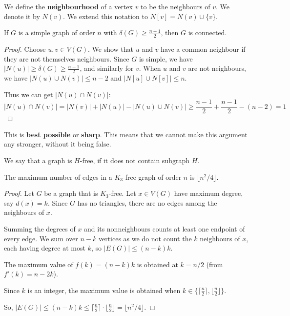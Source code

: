 We define the \textbf{neighbourhood} of a vertex $v$ to be the neighbours of $v$. We denote it by $N(v)$. We extend this notation to $N[v] = N(v) \cup \{v\}$.

\begin{proposition}
	If $G$ is a simple graph of order $n$ with $\delta(G) \ge \frac{n-1}{2}$, then $G$ is connected.
\end{proposition}
\begin{proof}
	Choose $u,v \in V(G)$. We show that $u$ and $v$ have a common neighbour if they are not themselves neighbours. Since $G$ is simple, we have $|N(u)|\ge \delta(G) \ge \frac{n-1}{2}$, and similarly for $v$.
	When $u$ and $v$ are not neighbours, we have $|N(u) \cup N(v)| \le n-2$ and $|N[u] \cup N[v]| \le n$.

	Thus we can get $|N(u) \cap N(v)|$:
	\begin{equation}
		|N(u) \cap N(v)| = |N(v)| + |N(u)| - |N(u) \cup N(v)| \ge \frac{n-1}{2} + \frac{n-1}{2} - (n-2) = 1
	\end{equation}
\end{proof}
This is \textbf{best possible} or \textbf{sharp}. This means that we cannot make this argument any stronger, without it being false.


We say that a graph is $H$-free, if it does not contain subgraph $H$.

\begin{theorem}[Mantel]
	The maximum number of edges in a $K_{3}$-free graph of order $n$ is $\lfloor n^{2} /4 \rfloor$.
\end{theorem}
\begin{proof}
	Let $G$ be a graph that is $K_{3}$-free. Let $x \in V(G)$ have maximum degree, say $d(x) = k$. Since $G$ has no triangles, there are no edges among the neighbours of $x$.

	Summing the degrees of $x$ and its nonneighbours counts at least one endpoint of every edge. We sum over $n-k$ vertices as we do not count the $k$ neighbours of $x$, each having degree at most $k$, so $|E(G)| \le (n-k)k$.

	The maximum value of $f(k) = (n-k)k$ is obtained at $k = n/2$ (from $f'(k) = n-2k$).

	Since $k$ is an integer, the maximum value is obtained when $k \in \{ \lceil \frac{n}{2} \rceil, \lfloor \frac{n}{2} \rfloor \}$.

	So, $|E(G)| \le (n-k)k \le \lceil \frac{n}{2} \rceil \cdot \lfloor \frac{n}{2} \rfloor = \lfloor n^{2}/4 \rfloor$.
\end{proof}

